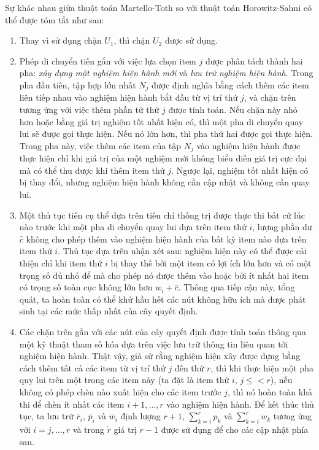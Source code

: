Sự khác nhau giữa thuật toán Martello-Toth so với thuật toán Horowitz-Sahni có thể được tóm tắt như sau:
\begin{enumerate}[label=(\roman*)]
    \item Thay vì sử dụng chặn $U_1$, thì chặn $U_2$ được sử dụng.
    \item  Phép di chuyển tiến gắn với việc lựa chọn item $j$ được phân tách thành hai pha: \emph{xây dựng một nghiệm hiện hành mới} và \emph{lưu trữ nghiệm hiện hành}. Trong pha đầu tiên, tập hợp lớn nhất $N_j$ được định nghĩa bằng cách thêm các item liên tiếp nhau vào nghiệm hiện hành bắt đầu từ vị trí thứ $j$, và chặn trên tương ứng với việc thêm phần tử thứ $j$ được tính toán. Nếu chặn này nhỏ hơn hoặc bằng giá trị nghiệm tốt nhất hiện có, thì một pha di chuyển quay lui sẽ được gọi thực hiện. Nếu nó lớn hơn, thì pha thứ hai được gọi thực hiện. Trong pha này, việc thêm các item của tập $N_j$ vào nghiệm hiện hành được thực hiện chỉ khi giá trị của một nghiệm mới không biểu diễn giá trị cực đại mà có thể thu được khi thêm item thứ $j$. Ngược lại, nghiệm tốt nhất hiện có bị thay đổi, nhưng nghiệm hiện hành không cần cập nhật và không cần quay lui.
    \item Một thủ tục tiến cụ thể dựa trên tiêu chí thống trị được thực thi bất cứ lúc nào trước khi một pha di chuyển quay lui dựa trên item thứ $i$, lượng phần dư $\hat{c}$ không cho phép thêm vào nghiệm hiện hành của bất kỳ item nào dựa trên item thứ $i$. Thủ tục dựa trên nhận xét sau: nghiệm hiện này có thể được cải thiện chỉ khi item thứ $i$ bị thay thế bởi một item có lợi ích lớn hơn và có một trọng số đủ nhỏ để mà cho phép nó được thêm vào hoặc bởi ít nhất hai item có trọng số toàn cục không lớn hơn $w_i + \hat{c}$. Thông qua tiếp cận này, tổng quát, ta hoàn toàn có thể khử hầu hết các nút không hữu ích mà được phát sinh tại các mức thấp nhất của cây quyết định. 
    \item Các chặn trên gắn với các nút của cây quyết định được tính toán thông qua một kỹ thuật tham số hóa dựa trên việc lưu trữ thông tin liên quan tới nghiệm hiện hành. Thật vậy, giả sử rằng nghiệm hiện xây được dựng bằng cách thêm tất cả các item từ vị trí thứ $j$ đến thứ $r$, thì khi thực hiện một pha quy lui trên một trong các item này (ta đặt là item thứ $i$, $j \leq < r$), nếu không có phép chèn nào xuất hiện cho các item trước $j$, thì nó hoàn toàn khả thi để chèn ít nhất các item $i+1, \dots, r$ vào nghiệm hiện hành. Để kết thúc thủ tục, ta lưu trữ $\bar{r}_i$, $\bar{p}_i$ và $\bar{w}_i$ định lượng $r + 1$, $\sum_{k = i}^rp_k$ và $\sum_{k=i}^rw_k$ tương ứng với $i = j,\dots, r$ và trong $\widetilde{r}$ giá trị $r - 1$ được sử dụng để cho các cập nhật phía sau.
\end{enumerate}

